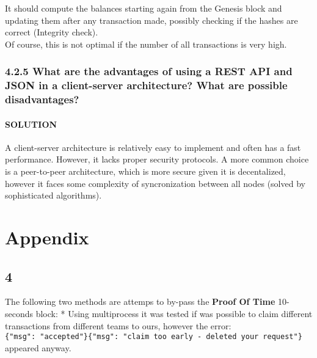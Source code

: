 \documentclass[11pt]{article}
\begin{document}
It should compute the balances starting again from the Genesis block and
updating them after any transaction made, possibly checking if the
hashes are correct (Integrity check).\\
Of course, this is not optimal if the number of all transactions is very
high.

    \hypertarget{what-are-the-advantages-of-using-a-rest-api-and-json-in-a-client-server-architecture-what-are-possible-disadvantages}{%
\subsubsection{4.2.5 What are the advantages of using a REST API and
JSON in a client-server architecture? What are possible
disadvantages?}\label{what-are-the-advantages-of-using-a-rest-api-and-json-in-a-client-server-architecture-what-are-possible-disadvantages}}

    \hypertarget{solution}{%
\paragraph{SOLUTION}\label{solution}}

A client-server architecture is relatively easy to implement and often
has a fast performance. However, it lacks proper security protocols. A
more common choice is a peer-to-peer architecture, which is more secure
given it is decentalized, however it faces some complexity of
syncronization between all nodes (solved by sophisticated algorithms).

    \hypertarget{appendix}{%
\section{Appendix}\label{appendix}}

    \hypertarget{section}{%
\subsection{4}\label{section}}

The following two methods are attemps to by-pass the \textbf{Proof Of
Time} 10-seconds block: * Using multiprocess it was tested if was
possible to claim different transactions from different teams to ours,
however the error:
\texttt{\{"msg":\ "accepted"\}\{"msg":\ "claim\ too\ early\ -\ deleted\ your\ request"\}}
appeared anyway.
\end{document}
